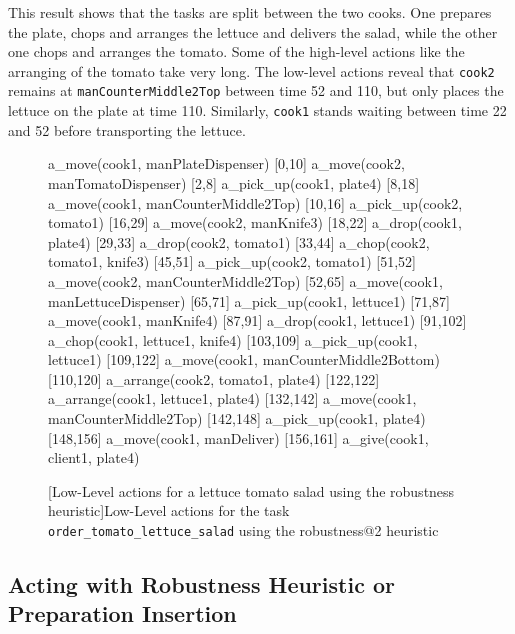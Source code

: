 This result shows that the tasks are split between the two cooks.
One prepares the plate, chops and arranges the lettuce and delivers the salad, while the other one chops and arranges the tomato.
Some of the high-level actions like the arranging of the tomato take very long.
The low-level actions reveal that \verb|cook2| remains at \verb|manCounterMiddle2Top| between time 52 and 110, but only places the lettuce on the plate at time 110.
Similarly, \verb|cook1| stands waiting between time 22 and 52 before transporting the lettuce.


\begin{figure}
  \begin{anmlcode}
  [0,2]     a_move(cook1, manPlateDispenser)
  [0,10]    a_move(cook2, manTomatoDispenser)
  [2,8]     a_pick_up(cook1, plate4)
  [8,18]    a_move(cook1, manCounterMiddle2Top)
  [10,16]   a_pick_up(cook2, tomato1)
  [16,29]   a_move(cook2, manKnife3)
  [18,22]   a_drop(cook1, plate4)
  [29,33]   a_drop(cook2, tomato1)
  [33,44]   a_chop(cook2, tomato1, knife3)
  [45,51]   a_pick_up(cook2, tomato1)
  [51,52]   a_move(cook2, manCounterMiddle2Top)
  [52,65]   a_move(cook1, manLettuceDispenser)
  [65,71]   a_pick_up(cook1, lettuce1)
  [71,87]   a_move(cook1, manKnife4)
  [87,91]   a_drop(cook1, lettuce1)
  [91,102]  a_chop(cook1, lettuce1, knife4)
  [103,109] a_pick_up(cook1, lettuce1)
  [109,122] a_move(cook1, manCounterMiddle2Bottom)
  [110,120] a_arrange(cook2, tomato1, plate4)
  [122,122] a_arrange(cook1, lettuce1, plate4)
  [132,142] a_move(cook1, manCounterMiddle2Top)
  [142,148] a_pick_up(cook1, plate4)
  [148,156] a_move(cook1, manDeliver)
  [156,161] a_give(cook1, client1, plate4)
  \end{anmlcode}
  [Low-Level actions for a lettuce tomato salad using the robustness heuristic]{Low-Level actions for the task \texttt{order\_tomato\_lettuce\_salad} using the robustness@2 heuristic}
\end{figure}

\subsection{Acting with Robustness Heuristic or Preparation Insertion}
\label{sec:evaluation-acting}

